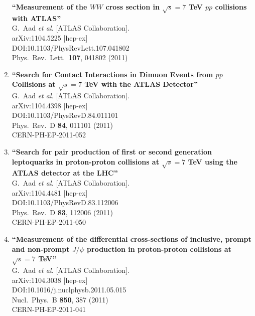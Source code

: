 \documentclass{article}
\begin{document}
\begin{enumerate}
{\bf ``Measurement of the $W W$ cross section in $\sqrt{s}=7$ TeV $pp$ collisions with ATLAS''}
  \\{}G.~Aad {\it et al.} [ATLAS Collaboration].
  \\{}arXiv:1104.5225 [hep-ex]
  \\{}DOI:10.1103/PhysRevLett.107.041802
  \\{}Phys.\ Rev.\ Lett.\  {\bf 107}, 041802 (2011)
\item%
{\bf ``Search for Contact Interactions in Dimuon Events from $pp$ Collisions at $\sqrt{s}=7$ TeV with the ATLAS Detector''}
  \\{}G.~Aad {\it et al.} [ATLAS Collaboration].
  \\{}arXiv:1104.4398 [hep-ex]
  \\{}DOI:10.1103/PhysRevD.84.011101
  \\{}Phys.\ Rev.\ D {\bf 84}, 011101 (2011)
  \\{}CERN-PH-EP-2011-052
\item%
{\bf ``Search for pair production of first or second generation leptoquarks in proton-proton collisions at $\sqrt{s}=7$ TeV using the ATLAS detector at the LHC''}
  \\{}G.~Aad {\it et al.} [ATLAS Collaboration].
  \\{}arXiv:1104.4481 [hep-ex]
  \\{}DOI:10.1103/PhysRevD.83.112006
  \\{}Phys.\ Rev.\ D {\bf 83}, 112006 (2011)
  \\{}CERN-PH-EP-2011-050
\item%
{\bf ``Measurement of the differential cross-sections of inclusive, prompt and non-prompt $J/\psi$ production in proton-proton collisions at $\sqrt{s}=7$ TeV''}
  \\{}G.~Aad {\it et al.} [ATLAS Collaboration].
  \\{}arXiv:1104.3038 [hep-ex]
  \\{}DOI:10.1016/j.nuclphysb.2011.05.015
  \\{}Nucl.\ Phys.\ B {\bf 850}, 387 (2011)
  \\{}CERN-PH-EP-2011-041

\end{enumerate}
\end{document}
